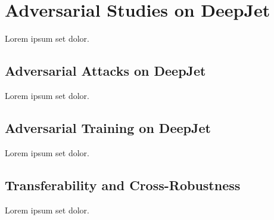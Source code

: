 \chapter{Adversarial Studies on DeepJet}
Lorem ipsum set dolor.

\section{Adversarial Attacks on DeepJet}
Lorem ipsum set dolor.

\section{Adversarial Training on DeepJet}
Lorem ipsum set dolor.

\section{Transferability and Cross-Robustness}
Lorem ipsum set dolor.